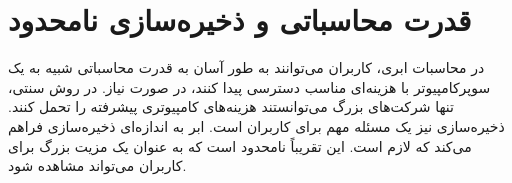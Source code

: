 \documentclass{book}
\begin{document}
    \section{قدرت محاسباتی و ذخیره‌سازی نامحدود}
    در محاسبات ابری، کاربران می‌توانند به طور آسان به قدرت محاسباتی شبیه به یک سوپرکامپیوتر با هزینه‌ای مناسب دسترسی پیدا کنند، در صورت نیاز. در روش سنتی، تنها شرکت‌های بزرگ می‌توانستند هزینه‌های کامپیوتری پیشرفته را تحمل کنند. ذخیره‌سازی نیز یک مسئله مهم برای کاربران است. ابر به اندازه‌ای ذخیره‌سازی فراهم می‌کند که لازم است. این تقریباً نامحدود است که به عنوان یک مزیت بزرگ برای کاربران می‌تواند مشاهده شود.
\end{document}
